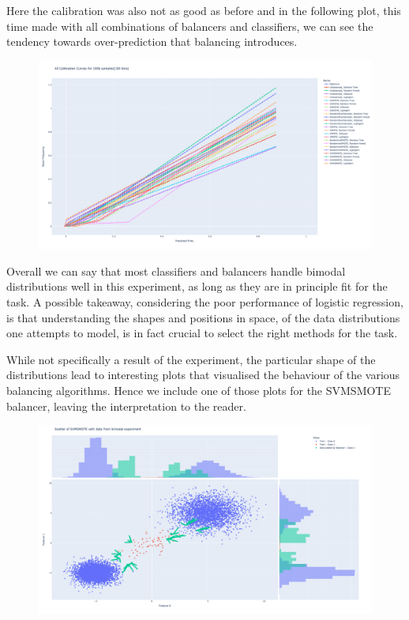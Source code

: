 Here the calibration was also not as good as before and in the following plot, this time made with all combinations of balancers and classifiers,
we can see the tendency towards over-prediction that balancing introduces.

\begin{figure}[H]
  	\centering
  	\includegraphics[width=0.9\linewidth]{assets/calibration_curves/All_Calibration Curves_lower_dist.png}
  	\label{fig:Cal_Curves_All_low_dist}
\end{figure}

Overall we can say that most classifiers and balancers handle bimodal distributions well in this experiment, as long as they are in principle fit for the task.
A possible takeaway, considering the poor performance of logistic regression, is that understanding the shapes and positions in space,
of the data distributions one attempts to model, is in fact crucial to select the right methods for the task.

While not specifically a result of the experiment, the particular shape of the distributions lead to interesting plots
that visualised the behaviour of the various balancing algorithms.
Hence we include one of those plots for the SVMSMOTE balancer, leaving the interpretation to the reader.
\begin{figure}[H]
  	\centering
  	\includegraphics[width=0.9\linewidth]{assets/data_vis/Scatter_of_SVMSMOTE_bimodal_experiment.png}
  	\label{fig:bimodal_svmsmote}
\end{figure}















